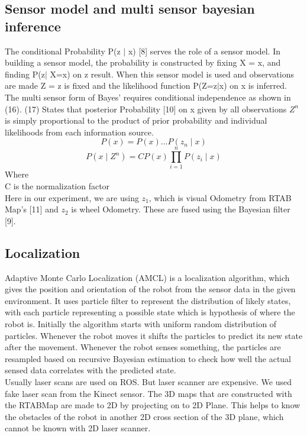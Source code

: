 \documentclass[conference]{IEEEtran}
\begin{document}
\subsection{Sensor model and multi sensor bayesian inference}
The conditional Probability P(z $\mid$ x) [8] serves the role of a sensor model. In building a sensor model, the probability is constructed by fixing X = x, and finding P(z$\mid$ X=x) on z result. When this sensor model is used and observations are made Z = z is fixed and the likelihood function P(Z=z$\mid$x) on x is inferred. The multi sensor form of Bayes’ requires conditional independence as shown in (16). (17) States that posterior Probability [10] on x given by all observations $Z^n$ is simply proportional to the product of prior probability and individual likelihoods from each information source.
\\
\begin{equation} \label{eq:17}
P(x)=P(x)...P(z_n \mid x)
\end{equation}
\begin{equation} \label{eq:18}
P(x \mid Z^n)=CP(x)\prod_{i=1}^{n}P(z_i \mid x)
\end{equation}
Where\\
C is the normalization factor
\\
Here in our experiment, we are using $z_1$, which is visual Odometry from RTAB Map's [11] and $z_2$ is wheel Odometry. These are fused using the Bayesian filter [9].
\subsection{Localization}
Adaptive Monte Carlo Localization (AMCL) is a localization algorithm, which gives the position and orientation of the robot from the sensor data in the given environment. It uses particle filter to represent the distribution of likely states, with each particle representing a possible state which is hypothesis of where the robot is. Initially the algorithm starts with uniform random distribution of particles. Whenever the robot moves it shifts the particles to predict its new state after the movement. Whenever the robot senses something, the particles are resampled based on recursive Bayesian estimation to check how well the actual sensed data correlates with the predicted state.\\
Usually laser scans are used on ROS. But laser scanner are expensive. We used fake laser scan from the Kinect sensor. The 3D maps that are constructed with the RTABMap are made to 2D by projecting on to 2D Plane. This helps to know the obstacles of the robot in another 2D cross section of the 3D plane, which cannot be known with 2D laser scanner.
\end{document}
